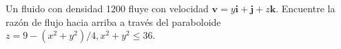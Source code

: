 \item Un fluido con densidad 1200 fluye con velocidad $\mathbf{v} = y\mathbf{i} + \mathbf{j} + z\mathbf{k}$. Encuentre la razón de flujo hacia arriba a través del paraboloide $z = 9 - (x^2 + y^2)/4, x^2 + y^2 \le 36$.
